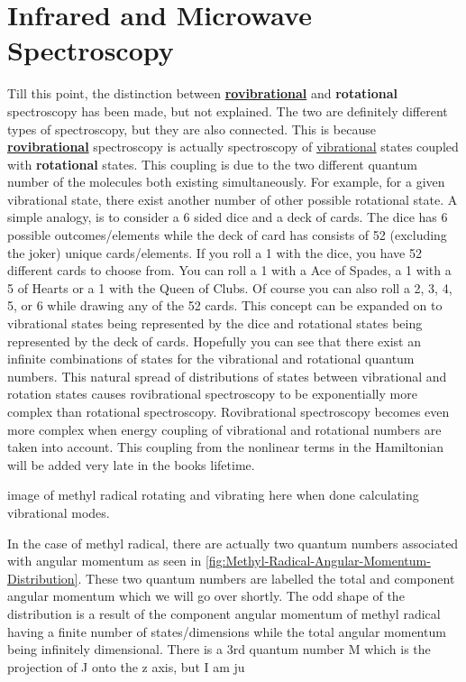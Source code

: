 \documentclass[11pt,a4paper]{book}
\begin{document}
	\section{Infrared and Microwave Spectroscopy}
		\label{sec:Infrared and Microwave Spectroscopy}
		Till this point, the distinction between \underline{\textbf{rovibrational}} and \textbf{rotational} spectroscopy has been made, but not explained. The two are definitely different types of spectroscopy, but they are also connected. This is because \underline{\textbf{rovibrational}} spectroscopy is actually spectroscopy of \underline{vibrational} states coupled with \textbf{rotational} states. This coupling is due to the two different quantum number of the molecules both existing simultaneously. For example, for a given vibrational state, there exist another number of other possible rotational state. A simple analogy, is to consider a 6 sided dice and a deck of cards. The dice has 6 possible outcomes/elements while the deck of card has consists of 52 (excluding the joker) unique cards/elements. If you roll a 1 with the dice, you have 52 different cards to choose from. You can roll a 1 with a Ace of Spades, a 1 with a 5 of Hearts or a 1 with the Queen of Clubs. Of course you can also roll a 2, 3, 4, 5, or 6 while drawing any of the 52 cards. This concept can be expanded on to vibrational states being represented by the dice and rotational states being represented by the deck of cards. Hopefully you can see that there exist an infinite combinations of states for the vibrational and rotational quantum numbers. This natural spread of distributions of states between vibrational and rotation states causes rovibrational spectroscopy to be exponentially more complex than rotational spectroscopy. Rovibrational spectroscopy becomes even more complex when energy coupling of vibrational and rotational numbers are taken into account. This coupling from the nonlinear terms in the Hamiltonian will be added very late in the books lifetime.
		
		image of methyl radical rotating and vibrating here when done calculating vibrational modes.
		
		In the case of methyl radical, there are actually two quantum numbers associated with angular momentum as seen in \autoref{fig:Methyl-Radical-Angular-Momentum-Distribution}. These two quantum numbers are labelled the total and component angular momentum which we will go over shortly. The odd shape of the distribution is a result of the component angular momentum of methyl radical having a finite number of states/dimensions while the total angular momentum being infinitely dimensional. There is a 3rd quantum number M which is the projection of J onto the z axis, but I am ju
		
\end{document}
